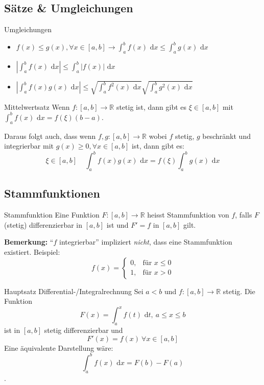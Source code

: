 \documentclass[a4paper,8pt]{extarticle}
\newenvironment{bemerkung}{
   \noindent \textbf{Bemerkung:  }}{}
\def\R{\mathbb{R}}
\def\dx{\text{ d}x}
\begin{document}
\subsection{Sätze \& Umgleichungen}
\begin{subbox}{Umgleichungen}
\begin{itemize}
 \item $f(x) \le g(x), \forall x \in [a,b] \rightarrow \int_a^b f(x) \dx \le \int_a^b g(x) \dx$
 \item $\left|\int_a^b f(x) \dx\right| \le \int_a^b |f(x)| \dx$
 \item $\left|\int_a^b f(x) g(x) \dx \right| \le \sqrt{\int_a^b f^2(x) \dx} \sqrt{\int_a^b g^2(x) \dx}$
\end{itemize}
\end{subbox}

\begin{mainbox}{Mittelwertsatz}
 Wenn $f: [a,b] \to \R$ stetig ist, dann gibt es $\xi \in [a,b]$ mit $\int_a^b f(x) \dx = f(\xi) (b-a)$.
\end{mainbox}
Daraus folgt auch, dass wenn $f,g: [a,b] \to \R$ wobei $f$ stetig, $g$ beschränkt und integrierbar mit $g(x) \ge 0, \forall x \in [a,b]$ ist, dann gibt es: $$\xi \in [a,b] \ \ \ \ \ \int_a^b f(x)g(x) \dx = f(\xi) \int_a^b g(x) \dx$$

\subsection{Stammfunktionen}
\begin{subbox}{Stammfunktion}
 Eine Funktion $F: [a,b] \to \R$ heisst Stammfunktion von $f$, falls $F$ (stetig) differenzierbar in $[a,b]$ ist und $F' = f$ in $[a,b]$ gilt.
\end{subbox}
\begin{bemerkung}
``$f$ integrierbar'' impliziert \textit{nicht}, dass eine Stammfunktion existiert. Beispiel:
$$
 f(x) = \begin{cases}
        0, & \text{für } x \le 0 \\
        1, & \text{für } x > 0
        \end{cases}
$$
\end{bemerkung}

\begin{mainbox}{Hauptsatz Differential-/Integralrechnung}
 Sei $a<b$ und $f: [a,b] \to \R$ stetig. Die Funktion 
 $$F(x) = \int_a^x f(t) \text{ d}t, \ a \le x \le b$$
 ist in $[a,b]$ stetig differenzierbar und $$F'(x) = f(x) \ \forall x \in [a,b]$$
 Eine äquivalente Darstellung wäre: $$\int_a^b f(x)\dx = F(b) - F(a)$$.
\end{mainbox}
\end{document}
